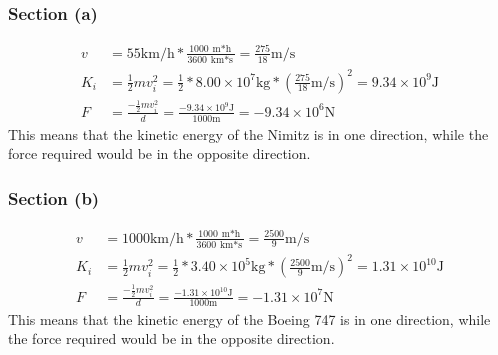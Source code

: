 \documentclass[12pt]{article}
\begin{document}
\subsubsection*{Section (a)}
\begin{align*}
    v   &= 55 \unit{\kilo\meter/\hour} * \frac{1000\ \unit{\meter*\hour}}{3600\ \unit{\kilo\meter*\second}} 
        = \frac{275}{18} \unit{\meter/\second}\\
    K_i &= \frac{1}{2}mv_i^2 
        = \frac{1}{2} * 8.00 \times 10^7 \unit{\kilo\gram} * \left( \frac{275}{18} \unit{\meter/\second} \right)^2 
        = 9.34 \times 10^9 \unit{\joule}\\
    F   &= \frac{-\frac{1}{2}mv_i^2}{d}
        = \frac{-9.34 \times 10^9 \unit{\joule}}{1000 \unit{\meter}}
        = -9.34 \times 10^6 \unit{\newton}
\end{align*}
This means that the kinetic energy of the Nimitz is  in one direction, while the force required would be  in the opposite direction.

\pagebreak
\subsubsection*{Section (b)}
\begin{align*}
    v   &= 1000 \unit{\kilo\meter/\hour} * \frac{1000\ \unit{\meter*\hour}}{3600\ \unit{\kilo\meter*\second}} 
        = \frac{2500}{9} \unit{\meter/\second}\\
    K_i &= \frac{1}{2}mv_i^2 
        = \frac{1}{2} * 3.40 \times 10^5 \unit{\kilo\gram} * \left( \frac{2500}{9} \unit{\meter/\second} \right)^2 
        = 1.31 \times 10^{10} \unit{\joule}\\
    F   &= \frac{-\frac{1}{2}mv_i^2}{d}
        = \frac{-1.31 \times 10^10 \unit{\joule}}{1000 \unit{\meter}}
        = -1.31 \times 10^7 \unit{\newton}
\end{align*}
This means that the kinetic energy of the Boeing 747 is  in one direction, while the force required would be  in the opposite direction.
\end{document}
